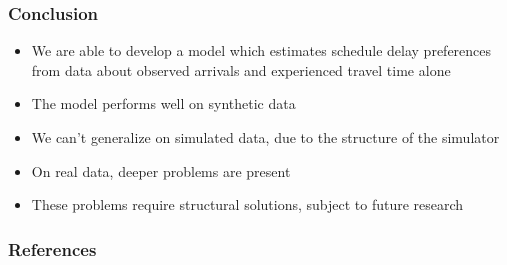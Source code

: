 \documentclass[hyperref={pdfpagelabels=false}]{beamer}
\begin{document}
\begin{frame}
  \frametitle{Conclusion}
  \begin{itemize}
  \item We are able to develop a model which estimates schedule delay preferences from data about observed arrivals and experienced travel time alone
  \item<2-> The model performs well on synthetic data
  \item<3-> We can't generalize on simulated data, due to the structure of the simulator
  \item<4-> On real data, deeper problems are present
  \item<5-> These problems require structural solutions, subject to future research
  \end{itemize}
\end{frame}

\begin{frame}[allowframebreaks]
  \frametitle{References}
  \printbibliography
\end{frame}
\end{document}
